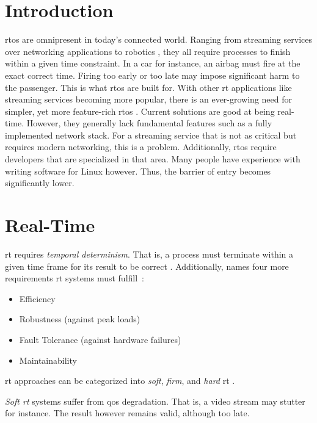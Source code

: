 \documentclass[10pt,twocolumn,a4paper]{article}
\begin{document}
\section{Introduction}\label{sec:introduction}

\acrfull{rtos} are omnipresent in today's connected world.
Ranging from streaming services over networking applications to robotics \cite{buttazzo_hard_1997}, they all require processes to finish within a given time constraint.
In a car for instance, an airbag must fire at the exact correct time.
Firing too early or too late may impose significant harm to the passenger.
This is what \acrshort{rtos} are built for.
With other \acrshort{rt} applications like streaming services becoming more popular, there is an ever-growing need for simpler, yet more feature-rich \acrshort{rtos} \cite{reghenzani_realtime_2019}.
Current solutions are good at being real-time.
However, they generally lack fundamental features such as a fully implemented network stack.
For a streaming service that is not as critical but requires modern networking, this is a problem.
Additionally, \acrshort{rtos} require developers that are specialized in that area.
Many people have experience with writing software for Linux however.
Thus, the barrier of entry becomes significantly lower.

\section{Real-Time}
\acrfull{rt} requires \emph{temporal determinism}.
That is, a process must terminate within a given time frame for its result to be correct \cite{reghenzani_realtime_2019}.
Additionally, \citeauthor{buttazzo_hard_1997} names four more requirements \acrshort{rt} systems must fulfill~\cite{buttazzo_hard_1997}:

\begin{itemize}
  \item Efficiency
  \item Robustness (against peak loads)
  \item Fault Tolerance (against hardware failures)
  \item Maintainability
\end{itemize}

\acrshort{rt} approaches can be categorized into \emph{soft}, \emph{firm}, and \emph{hard} \acrshort{rt} \cite{buttazzo_hard_1997}.

\emph{Soft \acrshort{rt}} systems suffer from \acrfull{qos} degradation.
That is, a video stream may stutter for instance.
The result however remains valid, although too late.
\end{document}
